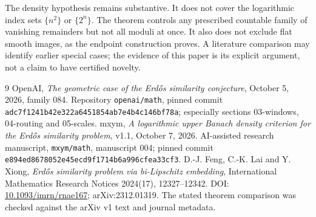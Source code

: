 \documentclass[11pt]{article}
\theoremstyle{remark}\newtheorem{remark}[theorem]{Remark}
\begin{document}
The density hypothesis remains substantive. It does not cover the logarithmic index sets $\{n^2\}$ or $\{2^n\}$. The theorem controls any prescribed countable family of vanishing remainders but not all moduli at once. It also does not exclude flat smooth images, as the endpoint construction proves. A literature comparison may identify earlier special cases; the evidence of this paper is its explicit argument, not a claim to have certified novelty.

\begin{thebibliography}{9}
 OpenAI, \emph{The geometric case of the Erd\H{o}s similarity conjecture}, October 5, 2026, family 084. Repository \texttt{openai/math}, pinned commit \texttt{adc7f1241b42e322a6451854ab7e4b4c146bf78a}; especially sections 03-windows, 04-routing and 05-scales.
 mxym, \emph{A logarithmic upper Banach density criterion for the Erd\H{o}s similarity problem}, v1.1, October 7, 2026. AI-assisted research manuscript, \texttt{mxym/math}, manuscript 004; pinned commit \texttt{e894ed8678052e45ecd9f1714b6a996cfea33cf3}.
 D.-J. Feng, C.-K. Lai and Y. Xiong, \emph{Erd\H{o}s similarity problem via bi-Lipschitz embedding}, International Mathematics Research Notices 2024(17), 12327--12342. DOI: \href{https://doi.org/10.1093/imrn/rnae167}{10.1093/imrn/rnae167}; arXiv:2312.01319. The stated theorem comparison was checked against the arXiv v1 text and journal metadata.
\end{thebibliography}
\end{document}
